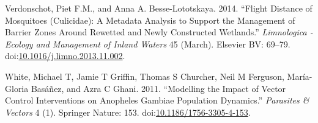 \documentclass[]{article}
\begin{document}
\hypertarget{ref-Verdonschot2014}{}
Verdonschot, Piet F.M., and Anna A. Besse-Lototskaya. 2014. ``Flight
Distance of Mosquitoes (Culicidae): A Metadata Analysis to Support the
Management of Barrier Zones Around Rewetted and Newly Constructed
Wetlands.'' \emph{Limnologica - Ecology and Management of Inland Waters}
45 (March). Elsevier BV: 69--79.
doi:\href{https://doi.org/10.1016/j.limno.2013.11.002}{10.1016/j.limno.2013.11.002}.

\hypertarget{ref-White2011}{}
White, Michael T, Jamie T Griffin, Thomas S Churcher, Neil M Ferguson,
María-Gloria Basáñez, and Azra C Ghani. 2011. ``Modelling the Impact of
Vector Control Interventions on Anopheles Gambiae Population Dynamics.''
\emph{Parasites \& Vectors} 4 (1). Springer Nature: 153.
doi:\href{https://doi.org/10.1186/1756-3305-4-153}{10.1186/1756-3305-4-153}.
\end{document}
